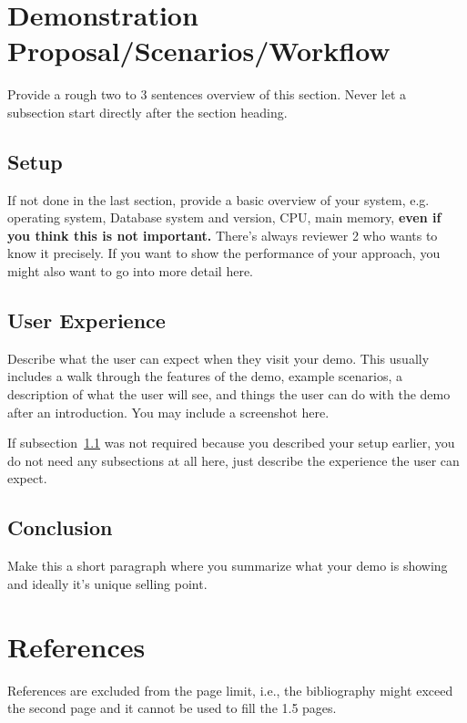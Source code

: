 \documentclass[conference]{IEEEtran}
\begin{document}
\section{Demonstration Proposal/Scenarios/Workflow}
Provide a rough two to 3 sentences overview of this section. Never let a subsection start directly after the section heading.
\subsection{Setup}\label{subsec:setup}
If not done in the last section, provide a basic overview of your system, e.g. operating system, Database system and version, CPU, main memory, \textbf{even if you think this is not important.} There's always reviewer 2 who wants to know it precisely. If you want to show the performance of your approach, you might also want to go into more detail here.
\subsection{User Experience}
Describe what the user can expect when they visit your demo. This usually includes a walk through the features of the demo, example scenarios, a description of what the user will see, and things the user can do with the demo after an introduction. You may include a screenshot here. 

If subsection~\ref{subsec:setup} was not required because you described your setup earlier, you do not need any subsections at all here, just describe the experience the user can expect.

\subsection{Conclusion}
Make this a short paragraph where you summarize what your demo is showing and ideally it's unique selling point.

\section*{References}
References are excluded from the page limit, i.e., the bibliography might exceed the second page and it cannot be used to fill the 1.5 pages.
\end{document}
